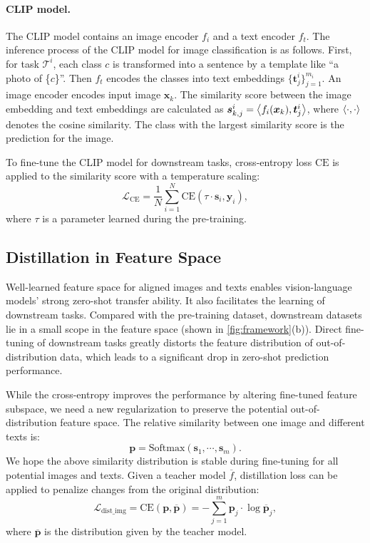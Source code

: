 \paragraph{CLIP model.} The CLIP model contains an image encoder $f_i$ and a text encoder $f_t$. The inference process of the CLIP model for image classification is as follows. First, for task $\mathcal{T}^i$, each class $c$ is transformed into a sentence by a template like ``a photo of \{$c$\}''. Then $f_t$ encodes the classes into text embeddings $\{\bm{t}^i_j\}_{j=1}^{m_i}$. An image encoder encodes input image $\bm{x}_k$. The similarity score between the image embedding and text embeddings are calculated as $\bm{s}^i_{k,j}=\Braket{f_i(\bm{x}_k),\bm{t}^i_j}$, where $\Braket{\cdot,\cdot}$ denotes the cosine similarity. The class with the largest similarity score is the prediction for the image. 

To fine-tune the CLIP model for downstream tasks, cross-entropy loss $\text{CE}$ is applied to the similarity score with a temperature scaling:
\begin{equation}
    \mathcal{L}_{\text{CE}} = \frac{1}{N}\sum_{i=1}^N\text{CE}(\tau\cdot \bm{s}_i, \bm{y}_i),
\end{equation}
where $\tau$ is a parameter learned during the pre-training.

\subsection{Distillation in Feature Space}

Well-learned feature space for aligned images and texts enables vision-language models' strong zero-shot transfer ability. It also facilitates the learning of downstream tasks. Compared with the pre-training dataset, downstream datasets lie in a small scope in the feature space (shown in \cref{fig:framework}(b)). Direct fine-tuning of downstream tasks greatly distorts the feature distribution of out-of-distribution data, which leads to a significant drop in zero-shot prediction performance.

While the cross-entropy improves the performance by altering fine-tuned feature subspace, we need a new regularization to preserve the potential out-of-distribution feature space. The relative similarity between one image and different texts is:
\begin{equation}
    \bm{p}=\text{Softmax}(\bm{s}_1, \cdots, \bm{s}_{m}).
\end{equation}
We hope the above similarity distribution is stable during fine-tuning for all potential images and texts. Given a teacher model $\overline{f}$, distillation loss can be applied to penalize changes from the original distribution:
\begin{equation}
    \mathcal{L}_{\text{dist\_img}}=\text{CE}(\bm{p},\bm{\overline{p}})=-\sum_{j=1}^m\bm{p}_j\cdot\log\bm{\overline{p}}_j, \label{eq:distimg}
\end{equation}
where $\overline{\bm{p}}$ is the distribution given by the teacher model.

